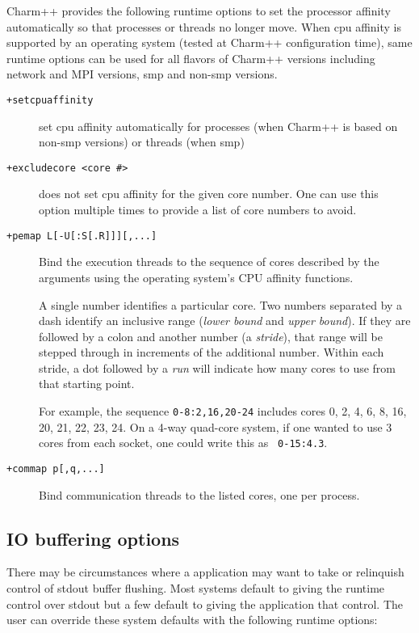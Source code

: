 Charm++ provides the following runtime options to set the processor affinity
automatically so that processes or threads no longer move. When cpu affinity
is supported by an operating system (tested at Charm++ configuration time),
same runtime options can be used for all flavors of Charm++ versions including
network and MPI versions, smp and non-smp versions.

\begin{description}

\item[{\tt +setcpuaffinity}]             set cpu affinity automatically for processes (when Charm++ is based on non-smp versions) or threads (when smp)

\item[{\tt +excludecore <core \#>}]       does not set cpu affinity for the given core number. One can use this option multiple times to provide a list of core numbers to avoid.

\item[{\tt +pemap L[-U[:S[.R]]][,...]}] Bind the execution threads to
  the sequence of cores described by the arguments using the operating
  system's CPU affinity functions.

A single number identifies a particular core. Two numbers separated by
a dash identify an inclusive range (\emph{lower bound} and \emph{upper
  bound}). If they are followed by a colon and another number (a
\emph{stride}), that range will be stepped through in increments of
the additional number. Within each stride, a dot followed by a
\emph{run} will indicate how many cores to use from that starting
point.

For example, the sequence {\tt 0-8:2,16,20-24} includes cores 0, 2, 4,
6, 8, 16, 20, 21, 22, 23, 24. On a 4-way quad-core system, if one
wanted to use 3 cores from each socket, one could write this as {\tt
  0-15:4.3}.

\item[{\tt +commap p[,q,...]}] Bind communication threads to the
  listed cores, one per process.

\end{description}

\subsection{IO buffering options}
\label{io buffer options}
There may be circumstances where a \charmpp{} application may want to take
or relinquish control of stdout buffer flushing. Most systems default to
giving the \charmpp{} runtime control over stdout but a few default to
giving the application that control. The user can override these system
defaults with the following runtime options:

